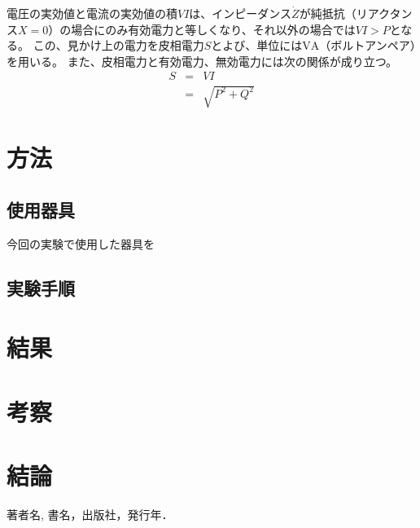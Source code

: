 \documentclass[11pt,dvipdfmx]{jarticle}
\begin{document}
電圧の実効値と電流の実効値の積$VI$は、インピーダンス$\dot{Z}$が純抵抗（リアクタンス$X=0$）の場合にのみ有効電力と等しくなり、それ以外の場合では$VI> P$となる。
この、見かけ上の電力を皮相電力$S$とよび、単位には$\mathrm{VA}$（ボルトアンペア）を用いる。
また、皮相電力と有効電力、無効電力には次の関係が成り立つ。
\begin{eqnarray}
	S &=& VI\nonumber\\
	&=& \sqrt{P^2+Q^2}
\end{eqnarray}


\section{方法}
\subsection{使用器具}
今回の実験で使用した器具を

\subsection{実験手順}


\section{結果}
\section{考察}
\section{結論}

\begin{thebibliography}{9}%
	 著者名, 書名，出版社，発行年．
\end{thebibliography}
\end{document}
